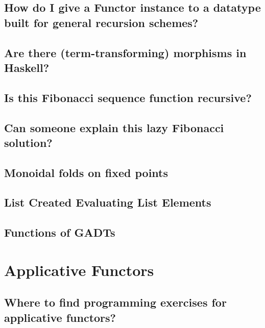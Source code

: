 \documentclass{book}%
\begin{document}
\section{How do I give a Functor instance to a datatype built for general recursion schemes?}


\section{Are there (term-transforming) morphisms in Haskell?}


\section{Is this Fibonacci sequence function recursive?}


\section{Can someone explain this lazy Fibonacci solution?}


\section{Monoidal folds on fixed points}


\section{List Created Evaluating List Elements}


\section{Functions of GADTs}



\chapter{Applicative Functors}

\section{Where to find programming exercises for applicative functors?}

\end{document}
